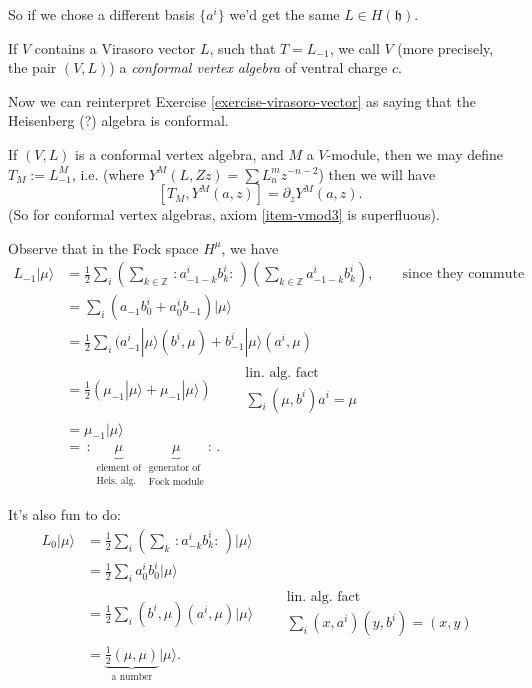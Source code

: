 So if we chose a different basis $\{a^i\}$ we'd get the same 
$L \in H(\mathfrak{h})$.

\begin{definition}
\label{definition-conformal-vertex-algebra}
If $V$ contains a Virasoro vector $L$,
such that $T=L_{-1}$,
we call $V$ (more precisely, the pair $(V,L)$)
a {\it conformal vertex algebra} of ventral charge $c$.
\end{definition}

\noindent
Now we can reinterpret Exercise \ref{exercise-virasoro-vector}
as saying that the Heisenberg (?) algebra is conformal.

\begin{remark}
\label{remark-third-axiom-vmod}
If $(V,L)$ is a conformal vertex algebra,
and $M$ a $V$-module, then we may define
$T_M:=L_{-1}^M$, i.e.
(where $Y^M(L,Zz)=\sum L^m_n z^{-n-2}$)
then we will have
$$
[T_M,Y^M(a,z)]=\partial_zY^M(a,z).
$$
(So for conformal vertex algebras, axiom \ref{item-vmod3} is superfluous).
\end{remark}

\noindent
Observe that in the Fock space $H^\mu$, we have
\begin{align*}
L_{-1}|\mu\rangle&=\frac{1}{2}\sum_i 
\left(\sum_{k \in \mathbb{Z}}\,:\!a^i_{-1-k}b^i_k\!:\,\right)
\left(\sum_{k \in \mathbb{Z}}a^i_{-1-k}b^i_k\right),
\qquad \text{since they commute}\\
&=\sum_i(a_{-1}b_0^i+a_0^ib_{-1})|\mu\rangle\\
&=\frac{1}{2}\sum_i(a^i_{-1}|\mu\rangle(b^i,\mu)
+b^i_{-1}|\mu\rangle (a^i,\mu)\\
&= \frac{1}{2}(\mu_{-1}|\mu\rangle+\mu_{-1}|\mu\rangle)
\qquad \substack{\text{lin. alg. fact} \\ \sum_i(\mu,b^i)a^i=\mu}\\
&=\mu_{-1}|\mu\rangle\\
&=\,:\!\underbrace{\mu}_{\substack{\text{element of} \\ \text{Heis. alg.}}}
\underbrace{\mu}_{\substack{\text{generator of} \\ \text{Fock module}}}\!:\,.
\end{align*}

\noindent
It's also fun to do:
\begin{align*}
L_0|\mu\rangle&=\frac{1}{2}\sum_i\left(\sum_k\,:\!a^i_{-k}
b^i_k\!:\,\right)|\mu\rangle\\
&=\frac{1}{2}\sum_i a_0^ib_0^i |\mu\rangle\\
&=\frac{1}{2}\sum_i(b^i,\mu)(a^i,\mu)|\mu\rangle
\qquad \substack{\text{lin. alg. fact} \\ \sum_i(x,a^i)(y,b^i)=(x,y)}\\
&=\underbrace{\frac{1}{2}(\mu,\mu)}_{\text{a number}}|\mu\rangle.
\end{align*}

